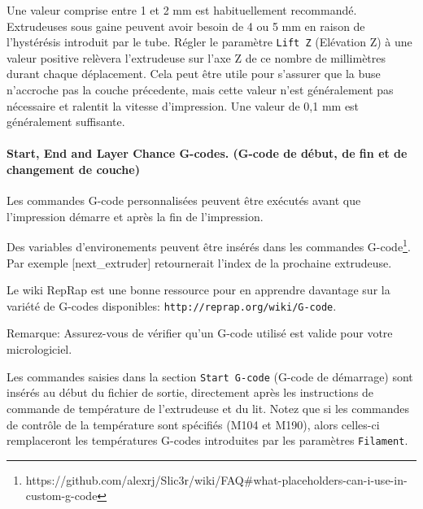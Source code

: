 Une valeur comprise entre 1 et 2 mm est habituellement recommand\'e. Extrudeuses sous gaine peuvent avoir besoin de 4 ou 5 mm en raison de l'hyst\'er\'esis introduit par le tube.
R\'egler le param\`etre \texttt{Lift Z} (El\'evation Z) \`a une valeur positive rel\`evera l'extrudeuse sur l'axe Z de ce nombre de millim\`etres durant chaque d\'eplacement. Cela peut \^etre utile pour s'assurer que la buse n'accroche pas la couche pr\'ecedente, mais cette valeur n'est g\'en\'eralement pas n\'ecessaire et ralentit la vitesse d'impression. Une valeur de 0,1 mm est g\'en\'eralement suffisante.

\paragraph{Start, End and Layer Chance G-codes. (G-code de d\'ebut, de fin et de changement de couche)} %
\label{par:start_end_g_code}
Les commandes G-code personnalis\'ees peuvent \^etre ex\'ecut\'es avant que l'impression d\'emarre et apr\`es la fin de l'impression.

Des variables d'environements peuvent \^etre ins\'er\'es dans les commandes G-code\footnote{https://github.com/alexrj/Slic3r/wiki/FAQ\#what-placeholders-can-i-use-in-custom-g-code}.  Par exemple [next\_extruder] retournerait l'index de la prochaine extrudeuse.

Le wiki RepRap est une bonne ressource pour en apprendre davantage sur la vari\'et\'e de G-codes disponibles: \texttt{http://reprap.org/wiki/G-code}.

Remarque: Assurez-vous de v\'erifier qu'un G-code utilis\'e est valide pour votre micrologiciel.

Les commandes saisies dans la section \texttt{Start G-code} (G-code de d\'emarrage) 
sont ins\'er\'es au d\'ebut du fichier de sortie, directement apr\`es les instructions de commande de temp\'erature de l'extrudeuse et du lit. Notez que si les commandes de contr\^ole de la temp\'erature sont sp\'ecifi\'es (M104 et M190), alors celles-ci remplaceront les temp\'eratures G-codes introduites par les param\`etres \texttt{Filament}.

